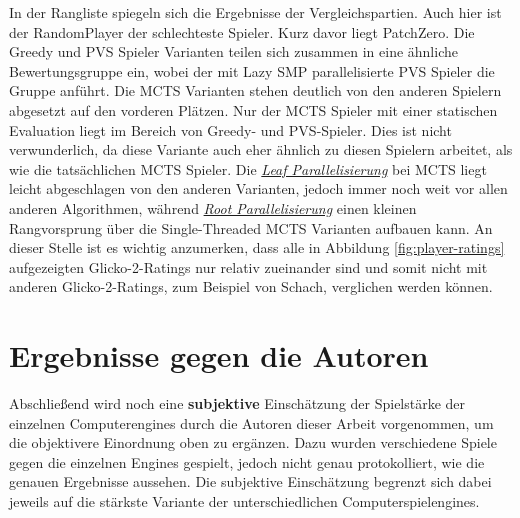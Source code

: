 In der Rangliste spiegeln sich die Ergebnisse der Vergleichspartien. Auch hier ist der RandomPlayer der schlechteste Spieler. Kurz davor liegt PatchZero. Die Greedy und \ac{PVS} Spieler Varianten teilen sich zusammen in eine ähnliche Bewertungsgruppe ein, wobei der mit Lazy \ac{SMP} parallelisierte \ac{PVS} Spieler die Gruppe anführt. Die \ac{MCTS} Varianten stehen deutlich von den anderen Spielern abgesetzt auf den vorderen Plätzen. Nur der \ac{MCTS} Spieler mit einer statischen Evaluation liegt im Bereich von Greedy- und \ac{PVS}-Spieler. Dies ist nicht verwunderlich, da diese Variante auch eher ähnlich zu diesen Spielern arbeitet, als wie die tatsächlichen \ac{MCTS} Spieler. Die \hyperref[text:leaf-parallelization]{\emph{Leaf Parallelisierung}} bei \ac{MCTS} liegt leicht abgeschlagen von den anderen Varianten, jedoch immer noch weit vor allen anderen Algorithmen, während \hyperref[text:root-parallelization]{\emph{Root Parallelisierung}} einen kleinen Rangvorsprung über die Single-Threaded \ac{MCTS} Varianten aufbauen kann. An dieser Stelle ist es wichtig anzumerken, dass alle in Abbildung \ref{fig:player-ratings} aufgezeigten Glicko-2-Ratings nur relativ zueinander sind und somit nicht mit anderen Glicko-2-Ratings, zum Beispiel von Schach, verglichen werden können.

\pagebreak

\section{Ergebnisse gegen die Autoren}

Abschließend wird noch eine \textbf{subjektive} Einschätzung der Spielstärke der einzelnen Computerengines durch die Autoren dieser Arbeit vorgenommen, um die objektivere Einordnung oben zu ergänzen. Dazu wurden verschiedene Spiele gegen die einzelnen Engines gespielt, jedoch nicht genau protokolliert, wie die genauen Ergebnisse aussehen. Die subjektive Einschätzung begrenzt sich dabei jeweils auf die stärkste Variante der unterschiedlichen Computerspielengines.

